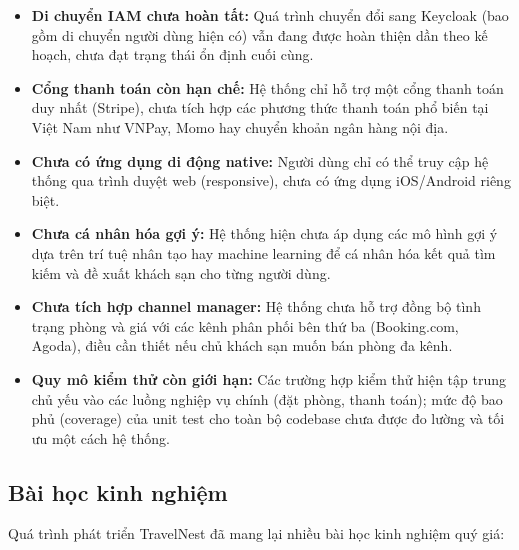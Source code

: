 \documentclass[13pt,a4paper,twoside]{report}
\begin{document}
\begin{itemize}
  \item \textbf{Di chuyển IAM chưa hoàn tất:} Quá trình chuyển đổi sang Keycloak (bao gồm di chuyển người dùng hiện có) vẫn đang được hoàn thiện dần theo kế hoạch, chưa đạt trạng thái ổn định cuối cùng.
  \item \textbf{Cổng thanh toán còn hạn chế:} Hệ thống chỉ hỗ trợ một cổng thanh toán duy nhất (Stripe), chưa tích hợp các phương thức thanh toán phổ biến tại Việt Nam như VNPay, Momo hay chuyển khoản ngân hàng nội địa.
  \item \textbf{Chưa có ứng dụng di động native:} Người dùng chỉ có thể truy cập hệ thống qua trình duyệt web (responsive), chưa có ứng dụng iOS/Android riêng biệt.
  \item \textbf{Chưa cá nhân hóa gợi ý:} Hệ thống hiện chưa áp dụng các mô hình gợi ý dựa trên trí tuệ nhân tạo hay machine learning để cá nhân hóa kết quả tìm kiếm và đề xuất khách sạn cho từng người dùng.
  \item \textbf{Chưa tích hợp channel manager:} Hệ thống chưa hỗ trợ đồng bộ tình trạng phòng và giá với các kênh phân phối bên thứ ba (Booking.com, Agoda), điều cần thiết nếu chủ khách sạn muốn bán phòng đa kênh.
  \item \textbf{Quy mô kiểm thử còn giới hạn:} Các trường hợp kiểm thử hiện tập trung chủ yếu vào các luồng nghiệp vụ chính (đặt phòng, thanh toán); mức độ bao phủ (coverage) của unit test cho toàn bộ codebase chưa được đo lường và tối ưu một cách hệ thống.
\end{itemize}

\subsection{Bài học kinh nghiệm}

Quá trình phát triển TravelNest đã mang lại nhiều bài học kinh nghiệm quý giá:
\end{document}
